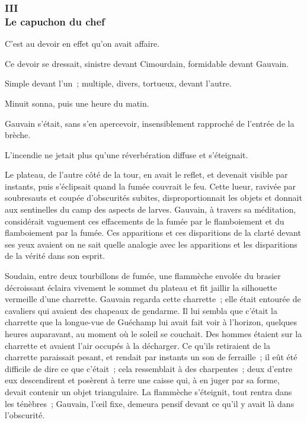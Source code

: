 \documentclass[french,twoside]{book} %
\begin{document}
 \subsubsection[{III. Le capuchon du chef}]{III \\
Le capuchon du chef}
\label{p3l6c3}
\noindent C’est au devoir en effet qu’on avait affaire.\par
Ce devoir se dressait, sinistre devant Cimourdain, formidable devant Gauvain.\par
Simple devant l’un ; multiple, divers, tortueux, devant l’autre.\par
Minuit sonna, puis une heure du matin.\par
Gauvain s’était, sans s’en apercevoir, insensiblement rapproché de l’entrée de la brèche.\par
L’incendie ne jetait plus qu’une réverbération diffuse et s’éteignait.\par
Le plateau, de l’autre côté de la tour, en avait le reflet, et devenait visible par instants, puis s’éclipsait quand la fumée couvrait le feu. Cette lueur, ravivée par soubresauts et coupée d’obscurités subites, disproportionnait les objets et donnait aux sentinelles du camp des aspects de larves. Gauvain, à travers sa méditation, considérait vaguement ces effacements de  la fumée par le flamboiement et du flamboiement par la fumée. Ces apparitions et ces disparitions de la clarté devant ses yeux avaient on ne sait quelle analogie avec les apparitions et les disparitions de la vérité dans son esprit.\par
Soudain, entre deux tourbillons de fumée, une flammèche envolée du brasier décroissant éclaira vivement le sommet du plateau et fit jaillir la silhouette vermeille d’une charrette. Gauvain regarda cette charrette ; elle était entourée de cavaliers qui avaient des chapeaux de gendarme. Il lui sembla que c’était la charrette que la longue-vue de Guéchamp lui avait fait voir à l’horizon, quelques heures auparavant, au moment où le soleil se couchait. Des hommes étaient sur la charrette et avaient l’air occupés à la décharger. Ce qu’ils retiraient de la charrette paraissait pesant, et rendait par instants un son de ferraille ; il eût été difficile de dire ce que c’était ; cela ressemblait à des charpentes ; deux d’entre eux descendirent et posèrent à terre une caisse qui, à en juger par sa forme, devait contenir un objet triangulaire. La flammèche s’éteignit, tout rentra dans les ténèbres ; Gauvain, l’œil fixe, demeura pensif devant ce qu’il y avait là dans l’obscurité.\par
\end{document}
